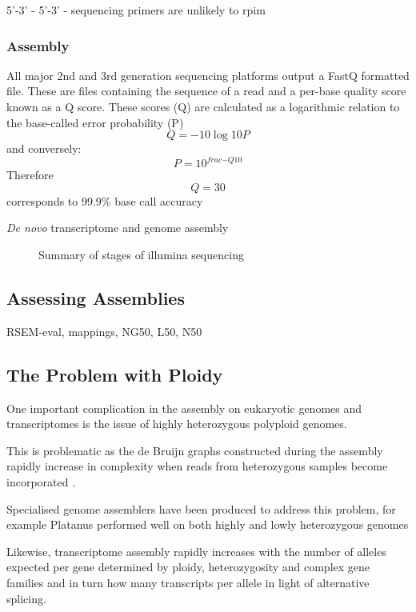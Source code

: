 5'-3' - 5'-3'  - sequencing primers are unlikely to rpim



\subsubsection{Assembly}

All major 2nd and 3rd generation sequencing platforms output a FastQ formatted file.
These are files containing the sequence of a read and a per-base quality score known as a Q score.
These scores (Q) are calculated as a logarithmic relation to the base-called error probability (P)
\[ Q = -10\log{10}{P} \]
and conversely: 
\[ P = 10^{frac{-Q}{10}} \]
Therefore \[Q = 30 \] corresponds to 99.9\% base call accuracy

\textit{De novo} transcriptome and genome assembly 



\begin{figure}
    Summary of stages of illumina sequencing
\end{figure}




\subsection{Assessing Assemblies}

RSEM-eval, mappings, NG50, L50, N50

\subsection{The Problem with Ploidy}

One important complication in the assembly on eukaryotic genomes and transcriptomes
is the issue of highly heterozygous polyploid genomes.

This is problematic as the de Bruijn graphs constructed during the assembly
rapidly increase in complexity when reads from heterozygous samples become
incorporated \citep{Kajitani2014}.


Specialised genome assemblers have been produced to address this problem,
for example Platanus performed well on both highly and lowly heterozygous 
genomes \citep{Katjitani2014}

Likewise, transcriptome assembly rapidly increases with the number of alleles
expected per gene determined by ploidy, heterozygosity and complex gene families
and in turn how many transcripts per allele in light of alternative splicing.

